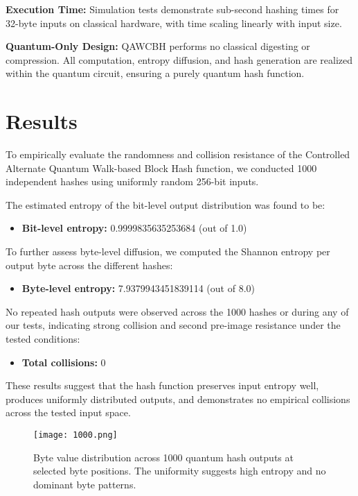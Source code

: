 \documentclass[conference]{IEEEtran}
\begin{document}
\textbf{Execution Time:} Simulation tests demonstrate sub-second hashing times for 32-byte inputs on classical hardware, with time scaling linearly with input size.

\textbf{Quantum-Only Design:} QAWCBH performs no classical digesting or compression. All computation, entropy diffusion, and hash generation are realized within the quantum circuit, ensuring a purely quantum hash function.

\section{Results}

To empirically evaluate the randomness and collision resistance of the Controlled Alternate Quantum Walk-based Block Hash function, we conducted 1000 independent hashes using uniformly random 256-bit inputs.

The estimated entropy of the bit-level output distribution was found to be:
\begin{itemize}
    \item \textbf{Bit-level entropy:} 0.9999835635253684 (out of 1.0)
\end{itemize}

To further assess byte-level diffusion, we computed the Shannon entropy per output byte across the different hashes:
\begin{itemize}
    \item \textbf{Byte-level entropy:}  7.9379943451839114 (out of 8.0)
\end{itemize}

No repeated hash outputs were observed across the 1000 hashes or during any of our tests, indicating strong collision and second pre-image resistance under the tested conditions:
\begin{itemize}
    \item \textbf{Total collisions:} 0
\end{itemize}

These results suggest that the hash function preserves input entropy well, produces uniformly distributed outputs, and demonstrates no empirical collisions across the tested input space.

\begin{figure}[!t]
    \centering
    \texttt{[image: 1000.png]}
    \caption{Byte value distribution across 1000 quantum hash outputs at selected byte positions. The uniformity suggests high entropy and no dominant byte patterns.}
    \label{fig:byte_distribution}
\end{figure}
\end{document}
